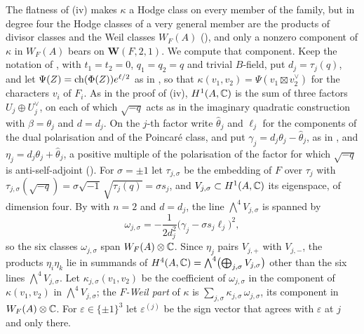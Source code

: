 The flatness of (iv) makes $\kappa$ a Hodge class on
every member of the family, but in degree four the Hodge classes of a very
general member are the products of divisor classes and the Weil classes
$W_{F}(A)$ (\cite[Proposition~17.3(iii)]{paperI}), and only a nonzero component of
$\kappa$ in $W_{F}(A)$ bears on $\mathbf{W}(F,2,1)$. We compute that
component. Keep the notation of , with $t_{1}=t_{2}=0$,
$q_{1}=q_{2}=q$ and trivial $B$-field, put $d_{j}=\tau_{j}(q)$, and let
$\Psi(Z)=\operatorname{ch}(\Phi(Z))e^{\ell/2}$ as in , so that
$\kappa(v_{1},v_{2})=\Psi(v_{1}\boxtimes v_{2}^{\vee})$ for the characters
$v_{i}$ of $F_{i}$. As in the proof of (iv),
$H^{1}(A,\mathbb{C})$ is the sum of three factors $U_{j}\oplus U_{j}^{\vee}$, on each
of which $\sqrt{-q}$ acts as in the imaginary quadratic construction with
$\beta=\theta_{j}$ and $d=d_{j}$. On the $j$-th factor write
$\widehat\theta_{j}$ and $\ell_{j}$ for the components of the dual
polarisation and of the Poincar\'e class, and put
$\gamma_{j}=d_{j}\theta_{j}-\widehat\theta_{j}$, as in \cite[(33)]{paperI},
and $\eta_{j}=d_{j}\theta_{j}+\widehat\theta_{j}$, a positive multiple of the
polarisation of the factor for which $\sqrt{-q}$ is anti-self-adjoint
(\cite[Proposition~15.19(i)]{paperI}). For $\sigma=\pm1$ let $\tau_{j,\sigma}$ be the
embedding of $F$ over $\tau_{j}$ with
$\tau_{j,\sigma}(\sqrt{-q})=\sigma\sqrt{-1}\,\sqrt{\tau_{j}(q)}=\sigma s_{j}$,
and $V_{j,\sigma}\subset H^{1}(A,\mathbb{C})$ its eigenspace, of dimension four. By
\cite[Theorem~15.2(ii)]{paperI} with $n=2$ and $d=d_{j}$, the line
$\bigwedge^{4}V_{j,\sigma}$ is spanned by
\begin{equation}\label{eq:sexticomega}
  \omega_{j,\sigma}=-\frac{1}{2d_{j}^{2}}\bigl(\gamma_{j}-\sigma s_{j}\ell_{j}\bigr)^{2},
\end{equation}
so the six classes $\omega_{j,\sigma}$ span $W_{F}(A)\otimes\mathbb{C}$. Since
$\eta_{j}$ pairs $V_{j,+}$ with $V_{j,-}$, the products $\eta_{i}\eta_{k}$ lie
in summands of $H^{4}(A,\mathbb{C})=\bigwedge^{4}\bigl(\bigoplus_{j,\sigma}
V_{j,\sigma}\bigr)$ other than the six lines $\bigwedge^{4}V_{j,\sigma}$. Let
$\kappa_{j,\sigma}(v_{1},v_{2})$ be the coefficient of $\omega_{j,\sigma}$ in
the component of $\kappa(v_{1},v_{2})$ in $\bigwedge^{4}V_{j,\sigma}$; the
\emph{$F$-Weil part} of $\kappa$ is
$\sum_{j,\sigma}\kappa_{j,\sigma}\,\omega_{j,\sigma}$, its component in
$W_{F}(A)\otimes\mathbb{C}$. For $\varepsilon\in\{\pm1\}^{3}$ let
$\varepsilon^{(j)}$ be the sign vector that agrees with $\varepsilon$ at $j$
and only there.

